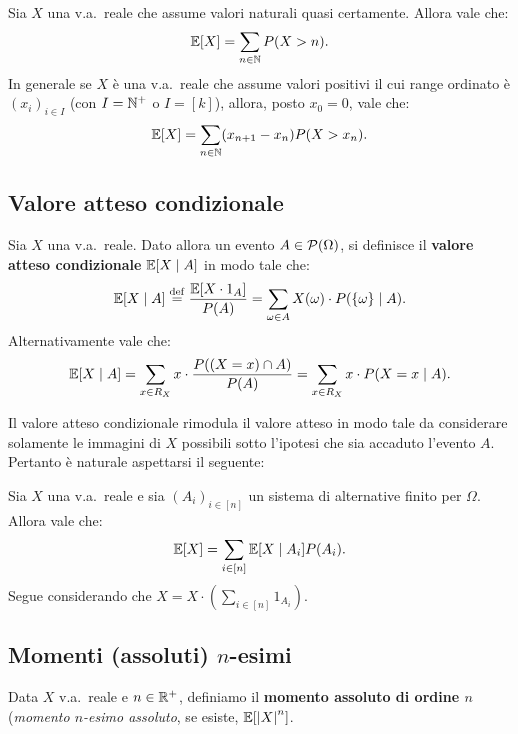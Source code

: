 \begin{multicols*}{2}
\begin{proposition}
    Sia $X$ una v.a.~reale che assume valori naturali quasi certamente.
    Allora vale che:
    \[
        \mathbb{E}[X] = \sum_{n \in \mathbb{N}} P(X > n).
    \]
    In generale se $X$ è una v.a.~reale che assume valori positivi il cui
    range ordinato è $(x_i)_{i \in I}$ (con $I = \mathbb{N}^+$ o $I = [k]$),
    allora, posto $x_0 = 0$, vale che:
    \[
        \mathbb{E}[X] = \sum_{n \in \mathbb{N}} (x_{n+1} - x_n) P(X > x_n).
    \]
\end{proposition}

\subsection{Valore atteso condizionale}

\begin{definition}
    Sia $X$ una v.a.~reale. Dato allora un evento
    $A \in \mathcal{P}(\Omega)$, si definisce il \textbf{valore atteso
    condizionale} $\mathbb{E}[X \mid A]$ in modo tale che:
    \[
        \mathbb{E}[X \mid A] \overset{\mathrm{def}}{=} \frac{\mathbb{E}[X \cdot 1_A]}{P(A)} = \sum_{\omega \in A} X(\omega) \cdot P(\{\omega\} \mid A).
    \]
    Alternativamente vale che:
    \[
        \mathbb{E}[X \mid A] = \sum_{x \in R_X} x \cdot \frac{P((X = x) \cap A)}{P(A)} = \sum_{x \in R_X} x \cdot P(X=x \mid A).
    \]
\end{definition}

Il valore atteso condizionale rimodula il valore atteso in modo
tale da considerare solamente le immagini di $X$ possibili sotto
l'ipotesi che sia accaduto l'evento $A$. Pertanto è naturale
aspettarsi il seguente:

\begin{lemma}
    Sia $X$ una v.a.~reale e sia $(A_i)_{i \in [n]}$ un sistema di alternative
    finito per $\Omega$. Allora vale che:
    \[
        \mathbb{E}[X] = \sum_{i \in [n]} \mathbb{E}[X \mid A_i] P(A_i).
    \]
    Segue considerando che $X = X \cdot (\sum_{i \in [n]} 1_{A_i})$.
\end{lemma}

\subsection{Momenti (assoluti) \texorpdfstring{$n$}{n}-esimi}
\label{sec:momenti_assoluti}

\begin{definition}
    Data $X$ v.a.~reale e $n \in \mathbb{R}^+$, definiamo il
    \textbf{momento assoluto di ordine $n$} (\textit{momento
    $n$-esimo assoluto}, se esiste, $\mathbb{E}[\left\lvert X \right\rvert^n]$. \smallskip


\end{definition}
\end{multicols*}
